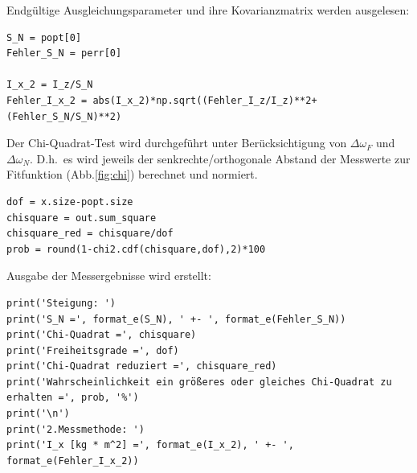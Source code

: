 \documentclass[a4paper,10pt]{article}
\begin{document}
Endgültige Ausgleichungsparameter und ihre Kovarianzmatrix werden ausgelesen:\begin{lstlisting}
S_N = popt[0]
Fehler_S_N = perr[0]

I_x_2 = I_z/S_N
Fehler_I_x_2 = abs(I_x_2)*np.sqrt((Fehler_I_z/I_z)**2+(Fehler_S_N/S_N)**2)

\end{lstlisting}

Der Chi-Quadrat-Test wird durchgeführt unter Berücksichtigung von \(\Delta \omega_F\) und \(\Delta \omega_N\). D.h.~es wird jeweils der senkrechte/orthogonale Abstand der Messwerte zur Fitfunktion (Abb.\ref{fig:chi}) berechnet und normiert\fnrefa.

\begin{lstlisting}
dof = x.size-popt.size
chisquare = out.sum_square
chisquare_red = chisquare/dof
prob = round(1-chi2.cdf(chisquare,dof),2)*100

\end{lstlisting}

Ausgabe der Messergebnisse wird erstellt:\begin{lstlisting}
print('Steigung: ')
print('S_N =', format_e(S_N), ' +- ', format_e(Fehler_S_N))
print('Chi-Quadrat =', chisquare)
print('Freiheitsgrade =', dof)
print('Chi-Quadrat reduziert =', chisquare_red)
print('Wahrscheinlichkeit ein größeres oder gleiches Chi-Quadrat zu erhalten =', prob, '%')
print('\n')
print('2.Messmethode: ')
print('I_x [kg * m^2] =', format_e(I_x_2), ' +- ', format_e(Fehler_I_x_2))
\end{lstlisting}
\end{document}
